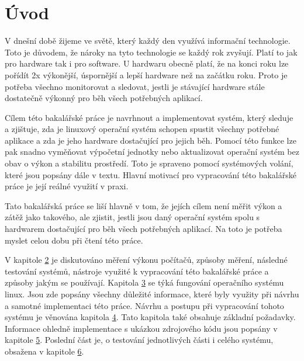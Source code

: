 \chapter{Úvod}

V dnešní době žijeme ve světě, který každý den využívá informační technologie. Toto je důvodem, že nároky na tyto technologie se
každý rok zvyšují. Platí to jak pro hardware tak i pro software. U hardwaru obecně platí, že na konci roku lze pořídít 2x výkonější,
úspornější a lepší hardware než na začátku roku. Proto je potřeba všechno monitorovat a sledovat, jestli je stávající hardware stále
dostatečně výkonný pro běh všech potřebných aplikací.

Cílem této bakalářské práce je navrhnout a implementovat systém, který sleduje a zjištuje, zda je linuxový operační systém schopen spustit
všechny potřebné aplikace a zda je jeho hardware dostačující pro jejich běh. Pomocí této funkce lze pak snadno vyměňovat výpočetní jednotky
nebo aktualizovat operační systém bez obav o výkon a stabilitu prostředí. Toto je spraveno pomocí systémových volání, které jsou popsány dále
v textu. Hlavní motivací pro vypracování této bakalářské práce je její reálné využití v praxi.

\iffalse
Na trhu neni nic podobneho nejak to napsat
\fi

Tato bakalářská práce se liší hlavně v tom, že jejích cílem není měřit výkon a zátěž jako takového, ale zjistit, jestli jsou daný operační systém spolu s hardwarem dostačující pro běh všech potřebných aplikací. Na toto je potřeba myslet celou dobu při čtení této práce.

V kapitole \hyperref[sec:RozborReseneProblematiky]{2} je diskutováno měření výkonu počítačů, způsoby měření, následné testování systémů, nástroje využité k vypracování této bakalářské práce a způsoby jakým se používají. Kapitola \hyperref[sec:FungovaniOperacnihoSystemuLinux]{3} se týká fungování operačního systému linux. Jsou zde popsány všechny důležité informace, které byly využity při návrhu a samotné implementaci této práce. Návrhu a postupu při vypracování tohoto systému je věnována kapitola \hyperref[sec:NavrhSystemu]{4}. Tato kapitola také obsahuje základní požadavky. Informace ohledně implementace s ukázkou zdrojového kódu jsou popsány v kapitole \hyperref[sec:ImplementaceSystemu]{5}. Poslední část je, o testování jednotlivých části i celého systému, obsažena v kapitole \hyperref[sec:Testovani]{6}.
